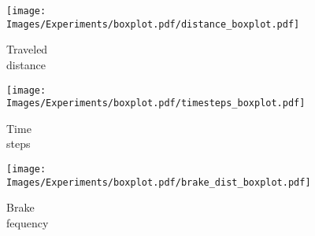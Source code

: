 \begin{figure*}[t]
    \centering
    \begin{subfigure}{1.11\textwidth}
    \centering
        \begin{minipage}{.7\textwidth}
        \raggedright
        \texttt{[image: Images/Experiments/boxplot.pdf/distance\_boxplot.pdf]}
        \end{minipage}
        \hspace*{-.3cm}
        \begin{minipage}{.3\textwidth}
        \centering
        \caption{Traveled\\ distance}    
        \end{minipage}
    \end{subfigure}
    
    \begin{subfigure}{1.11\textwidth}
    \centering
    \begin{minipage}{.7\textwidth}
    \raggedright
        \texttt{[image: Images/Experiments/boxplot.pdf/timesteps\_boxplot.pdf]}      
    \end{minipage}
    \hspace*{-.3cm}
    \begin{minipage}{.3\textwidth}
    \centering
        \caption{Time \\steps}
    \end{minipage}
    \end{subfigure}
    
    \begin{subfigure}{1.11\textwidth}
    \centering
    \begin{minipage}{.7\textwidth}
    \raggedright
        \texttt{[image: Images/Experiments/boxplot.pdf/brake\_dist\_boxplot.pdf]}
    \end{minipage}
    \hspace*{-.3cm}
    \begin{minipage}{.3\textwidth}
    \centering
           \caption{Brake\\ fequency} 
    \end{minipage}
       
    \end{subfigure}
    

\end{figure*}
